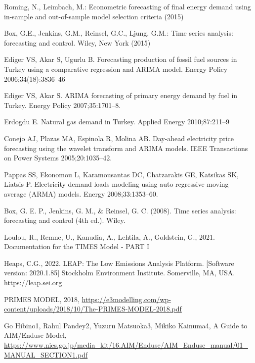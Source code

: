 \documentclass[lettersize,journal]{IEEEtran}
\begin{document}
\begin{thebibliography}{1}
  Roming, N., Leimbach, M.: Econometric forecasting of final energy demand using in-sample and out-of-sample model selection criteria (2015)

  Box, G.E., Jenkins, G.M., Reinsel, G.C., Ljung, G.M.: Time series analysis: forecasting and control. Wiley, New York (2015)

  Ediger VS, Akar S, Ugurlu B. Forecasting production of fossil fuel sources in Turkey using a comparative regression and ARIMA model. Energy Policy 2006;34(18):3836–46

  Ediger VS, Akar S. ARIMA forecasting of primary energy demand by fuel in Turkey. Energy Policy 2007;35:1701–8.

  Erdogdu E. Natural gas demand in Turkey. Applied Energy 2010;87:211–9

  Conejo AJ, Plazas MA, Espinola R, Molina AB. Day-ahead electricity price forecasting using the wavelet transform and ARIMA models. IEEE Transactions on Power Systems 2005;20:1035–42.

  Pappas SS, Ekonomou L, Karamousantas DC, Chatzarakis GE, Katsikas SK, Liatsis P. Electricity demand loads modeling using auto regressive moving average (ARMA) models. Energy 2008;33:1353–60.

  Box, G. E. P., Jenkins, G. M., \& Reinsel, G. C. (2008). Time series analysis: forecasting and control (4th ed.). Wiley.

  Loulou, R., Remne, U., Kanudia, A., Lehtila, A., Goldstein, G., 2021. Documentation for the TIMES Model - PART I


  Heaps, C.G., 2022. LEAP: The Low Emissions Analysis Platform. [Software version: 2020.1.85] Stockholm Environment Institute. Somerville, MA, USA. https://leap.sei.org

  PRIMES MODEL, 2018, \url{https://e3modelling.com/wp-content/uploads/2018/10/The-PRIMES-MODEL-2018.pdf}

  Go Hibino1, Rahul Pandey2, Yuzuru Matsuoka3, Mikiko Kainuma4, A Guide to  AIM/Enduse Model, \url{https://www.nies.go.jp/media_kit/16.AIM/Enduse/AIM_Enduse_manual/01_MANUAL_SECTION1.pdf}

\end{thebibliography}
\end{document}
